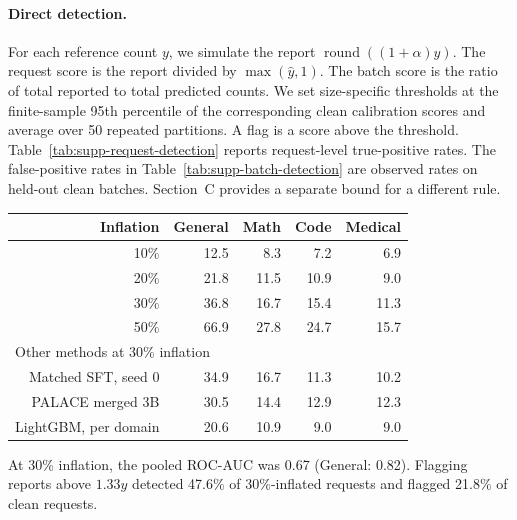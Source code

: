 \documentclass[11pt]{article}
\begin{document}
\paragraph{Direct detection.}
For each reference count \(y\), we simulate the report \(\operatorname{round}((1+\alpha)y)\). The request score is the report divided by \(\max(\hat y,1)\). The batch score is the ratio of total reported to total predicted counts. We set size-specific thresholds at the finite-sample 95th percentile of the corresponding clean calibration scores and average over 50 repeated partitions. A flag is a score above the threshold. Table~\ref{tab:supp-request-detection} reports request-level true-positive rates. The false-positive rates in Table~\ref{tab:supp-batch-detection} are observed rates on held-out clean batches. Section~C provides a separate bound for a different rule.

\begin{center}
\begin{minipage}{\linewidth}
\centering
{}\label{tab:supp-request-detection}
\small
\begin{tabular}{rrrrr}
\toprule
Inflation & General & Math & Code & Medical\\
\midrule
10\% &12.5&8.3&7.2&6.9\\
20\% &21.8&11.5&10.9&9.0\\
30\% &36.8&16.7&15.4&11.3\\
50\% &66.9&27.8&24.7&15.7\\
\midrule
\multicolumn{5}{l}{Other methods at 30\% inflation}\\
Matched SFT, seed 0 &34.9&16.7&11.3&10.2\\
PALACE merged 3B &30.5&14.4&12.9&12.3\\
LightGBM, per domain &20.6&10.9&9.0&9.0\\
\bottomrule
\end{tabular}
\end{minipage}
\end{center}
At 30\% inflation, the pooled ROC-AUC was 0.67 (General: 0.82). Flagging reports above \(1.33\hat y\) detected 47.6\% of 30\%-inflated requests and flagged 21.8\% of clean requests.
\end{document}
